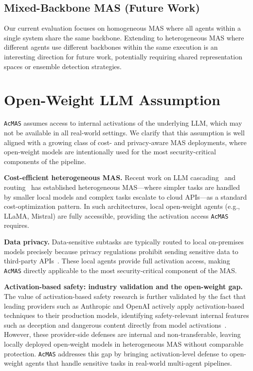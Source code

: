 \documentclass{article}
\newcommand{\app}{\texttt{AcMAS}}
\theoremstyle{plain}
\theoremstyle{definition}
\theoremstyle{remark}
\begin{document}
\subsection{Mixed-Backbone MAS (Future Work)}

Our current evaluation focuses on homogeneous MAS where all agents 
within a single system share the same backbone. Extending to 
heterogeneous MAS where different agents use different backbones 
within the same execution is an interesting direction for future work, 
potentially requiring shared representation spaces or ensemble 
detection strategies.


\section{Open-Weight LLM Assumption}
\label{app:open_weight}

\app{} assumes access to internal activations of the underlying LLM, 
which may not be available in all real-world settings. We clarify 
that this assumption is well aligned with a growing class of cost- 
and privacy-aware MAS deployments, where open-weight models are 
intentionally used for the most security-critical components of the 
pipeline.

\noindent\textbf{Cost-efficient heterogeneous MAS.}
Recent work on LLM cascading~\cite{chen2023frugalgpt} and routing~\cite{ong2024routellm, moslem2026dynamic} has established heterogeneous MAS---where simpler tasks are handled by smaller local models and complex tasks escalate to cloud APIs---as a standard cost-optimization pattern. In such architectures, local open-weight agents (e.g., LLaMA, Mistral) are fully accessible, providing the activation access \app{} requires.

\noindent\textbf{Data privacy.}
Data-sensitive subtasks are typically routed to local on-premises 
models precisely because privacy regulations prohibit sending 
sensitive data to third-party APIs~\cite{huang2025middle}. 
These local agents provide full activation access, making \app{} 
directly applicable to the most security-critical component of the 
MAS.

\noindent\textbf{Activation-based safety: industry validation and the open-weight gap.} The value of activation-based safety research is further validated by the fact that leading providers such as Anthropic and OpenAI actively apply activation-based techniques to their production models, identifying safety-relevant internal features such as deception and dangerous content directly from model activations~\cite{templeton2024scaling, gao2025scaling}. However, these provider-side defenses are internal and non-transferable, leaving locally deployed open-weight models in heterogeneous MAS without comparable protection. \app{} addresses this gap by bringing activation-level defense to open-weight agents that handle sensitive tasks in real-world multi-agent pipelines.
\end{document}
